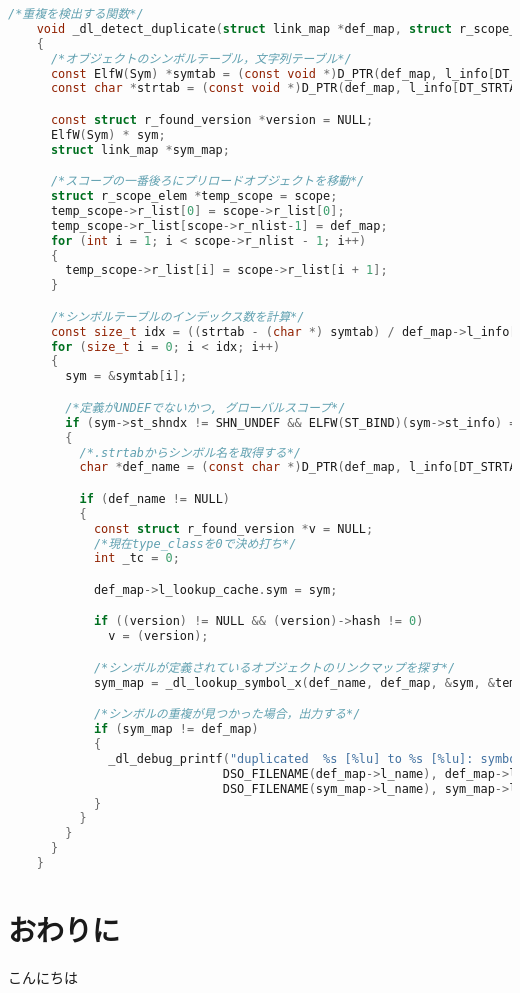 \documentclass[submit,techreq,noauthor]{eco}	%
\begin{document}
\begin{figure*}[t]
	\centering
  \caption{ソースコード：\_dl\_detect\_deplicate}
  \begin{lstlisting}[language=c]
    /*重複を検出する関数*/
    void _dl_detect_duplicate(struct link_map *def_map, struct r_scope_elem *scope)
    {
      /*オブジェクトのシンボルテーブル，文字列テーブル*/
      const ElfW(Sym) *symtab = (const void *)D_PTR(def_map, l_info[DT_SYMTAB]);
      const char *strtab = (const void *)D_PTR(def_map, l_info[DT_STRTAB]);

      const struct r_found_version *version = NULL;
      ElfW(Sym) * sym;
      struct link_map *sym_map;

      /*スコープの一番後ろにプリロードオブジェクトを移動*/
      struct r_scope_elem *temp_scope = scope;
      temp_scope->r_list[0] = scope->r_list[0];
      temp_scope->r_list[scope->r_nlist-1] = def_map;
      for (int i = 1; i < scope->r_nlist - 1; i++)
      {
        temp_scope->r_list[i] = scope->r_list[i + 1];
      }

      /*シンボルテーブルのインデックス数を計算*/
      const size_t idx = ((strtab - (char *) symtab) / def_map->l_info[DT_SYMENT]->d_un.d_val);
      for (size_t i = 0; i < idx; i++)
      {
        sym = &symtab[i];

        /*定義がUNDEFでないかつ, グローバルスコープ*/
        if (sym->st_shndx != SHN_UNDEF && ELFW(ST_BIND)(sym->st_info) == STB_GLOBAL)
        {
          /*.strtabからシンボル名を取得する*/
          char *def_name = (const char *)D_PTR(def_map, l_info[DT_STRTAB]) + (*sym).st_name;

          if (def_name != NULL)
          {
            const struct r_found_version *v = NULL;
            /*現在type_classを0で決め打ち*/
            int _tc = 0;

            def_map->l_lookup_cache.sym = sym;

            if ((version) != NULL && (version)->hash != 0)
              v = (version);

            /*シンボルが定義されているオブジェクトのリンクマップを探す*/
            sym_map = _dl_lookup_symbol_x(def_name, def_map, &sym, &temp_scope, v, _tc, DL_LOOKUP_ADD_DEPENDENCY | DL_LOOKUP_FOR_RELOCATE, 0);

            /*シンボルの重複が見つかった場合，出力する*/
            if (sym_map != def_map)
            {
              _dl_debug_printf("duplicated  %s [%lu] to %s [%lu]: symbol `%s'\n",
                              DSO_FILENAME(def_map->l_name), def_map->l_ns,
                              DSO_FILENAME(sym_map->l_name), sym_map->l_ns,def_name);
            }
          }
        }
      }
    }
  \end{lstlisting}
	\label{listings:code}
\end{figure*}


\section{おわりに}
こんにちは


\setlength\baselineskip{12pt}
{\small
	
	
}
\end{document}
